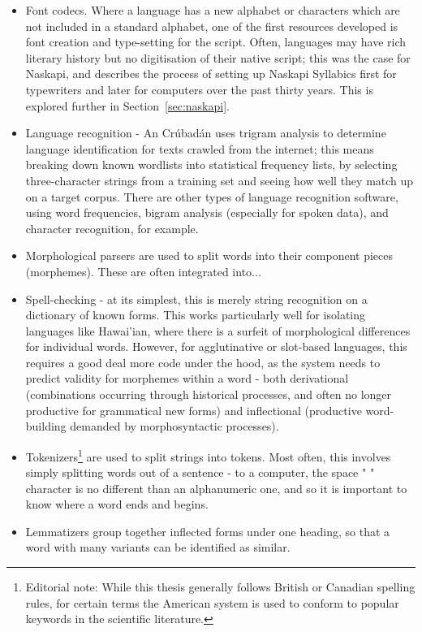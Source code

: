 \begin{itemize}
  \item Font codecs. Where a language has a new alphabet or characters which are not included in a standard alphabet, one of the first resources developed is font creation and type-setting for the script. Often, languages may have rich literary history but no digitisation of their native script; this was the case for Naskapi, and \citep{jancewicz2002applied} describes the process of setting up Naskapi Syllabics first for typewriters and later for computers over the past thirty years. This is explored further in Section~\ref{sec:naskapi}.
  \item Language recognition - An Cr\'ubad\'an \citep{scannell2007crubadan} uses trigram analysis to determine language identification for texts crawled from the internet; this means breaking down known wordlists into statistical frequency lists, by selecting three-character strings from a training set and seeing how well they match up on a target corpus. There are other types of language recognition software, using word frequencies, bigram analysis (especially for spoken data), and character recognition, for example.
  \item Morphological parsers are used to split words into their component pieces (morphemes). These are often integrated into...
  \item Spell-checking - at its simplest, this is merely string recognition on a dictionary of known forms. This works particularly well for isolating languages like Hawai'ian, where there is a surfeit of morphological differences for individual words. However, for agglutinative or slot-based languages, this requires a good deal more code under the hood, as the system needs to predict validity for morphemes within a word - both derivational (combinations occurring through historical processes, and often no longer productive for grammatical new forms) and inflectional (productive word-building demanded by morphosyntactic processes).
  \item Tokenizers\footnote{Editorial note: While this thesis generally follows British or Canadian spelling rules, for certain terms the American system is used to conform to popular keywords in the scientific literature.} are used to split strings into tokens. Most often, this involves simply splitting words out of a sentence - to a computer, the space " " character is no different than an alphanumeric one, and so it is important to know where a word ends and begins.
  \item Lemmatizers group together inflected forms under one heading, so that a word with many variants can be identified as similar.

\end{itemize}
